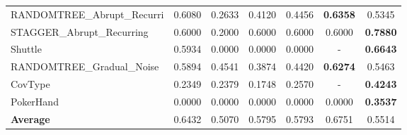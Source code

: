 \begin{table}[htbp]
\begin{tabular}{lcccccc}
RANDOMTREE_Abrupt_Recurri & 0.6080 & 0.2633 & 0.4120 & 0.4456 & \textbf{0.6358} & 0.5345 \\
STAGGER_Abrupt_Recurring & 0.6000 & 0.2000 & 0.6000 & 0.6000 & 0.6000 & \textbf{0.7880} \\
Shuttle & 0.5934 & 0.0000 & 0.0000 & 0.0000 & - & \textbf{0.6643} \\
RANDOMTREE_Gradual_Noise & 0.5894 & 0.4541 & 0.3874 & 0.4420 & \textbf{0.6274} & 0.5463 \\
CovType & 0.2349 & 0.2379 & 0.1748 & 0.2570 & - & \textbf{0.4243} \\
PokerHand & 0.0000 & 0.0000 & 0.0000 & 0.0000 & 0.0000 & \textbf{0.3537} \\
\midrule
\textbf{Average} & 0.6432 & 0.5070 & 0.5795 & 0.5793 & 0.6751 & 0.5514 \\
\bottomrule
\end{tabular}
\end{table}
